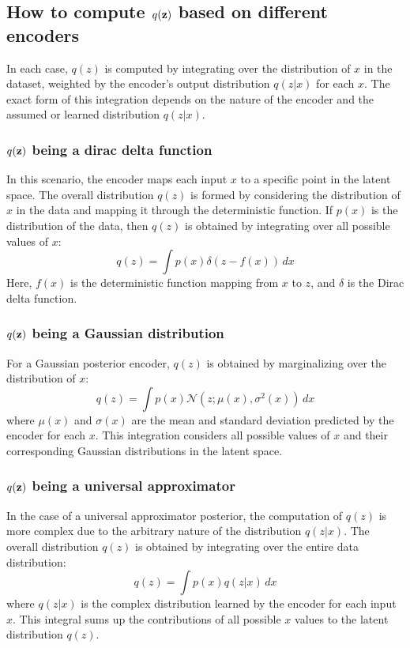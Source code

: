 \documentclass[a4paper]{article}
\begin{document}
\subsection{How to compute $q(\mathbf{z})$ based on different encoders}
In each case, $q(z)$ is computed by integrating over the distribution of $x$ in the dataset, weighted by the encoder's
output distribution $q(z|x)$ for each $x$. The exact form of this integration depends on the nature of the encoder and
the assumed or learned distribution $q(z|x)$.

\subsubsection{$q(\mathbf{z})$ being a dirac delta function}
In this scenario, the encoder maps each input $x$ to a specific point in the latent space. The overall distribution
$q(z)$ is formed by considering the distribution of $x$ in the data and mapping it through the deterministic function.
If $p(x)$ is the distribution of the data, then $q(z)$ is obtained by integrating over all possible values of $x$:
$$q(z) = \int p(x) \delta(z - f(x)) \, dx$$
Here, $f(x)$ is the deterministic function mapping from $x$ to $z$, and $\delta$ is the Dirac delta function.

\subsubsection{$q(\mathbf{z})$ being a Gaussian distribution}
For a Gaussian posterior encoder, $q(z)$ is obtained by marginalizing over the distribution of $x$:
$$q(z) = \int p(x) \mathcal{N}(z; \mu(x), \sigma^2(x)) \, dx$$ where $\mu(x)$ and $\sigma(x)$ are the mean and standard
deviation predicted by the encoder for each $x$. This integration considers all possible values of $x$ and their
corresponding Gaussian distributions in the latent space.


\subsubsection{$q(\mathbf{z})$ being a universal approximator}
In the case of a universal approximator posterior, the computation of $q(z)$ is more complex due to the arbitrary nature
of the distribution $q(z|x)$. The overall distribution $q(z)$ is obtained by integrating over the entire data distribution:
$$q(z) = \int p(x) q(z|x) \, dx$$ where $q(z|x)$ is the complex distribution learned by the encoder for each input $x$.
This integral sums up the contributions of all possible $x$ values to the latent distribution $q(z)$.
\end{document}
